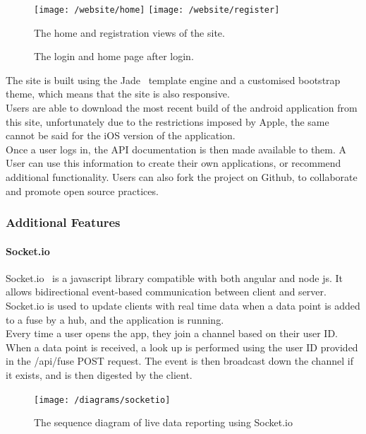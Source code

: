 \documentclass[draft,preprint,12pt,3p]{elsarticle}
\begin{document}
\begin{figure}[H]
    \centering
    \texttt{[image: /website/home]}
    \texttt{[image: /website/register]}
    \caption {The home and registration views of the site.}
\end{figure}
\begin{figure}[H]
    \centering

    \caption {The login and home page after login.}
\end{figure}

The site is built using the Jade~\cite{jade} template engine and a customised bootstrap~\cite{bootstrap} theme, which means that the site is also responsive.\\
Users are able to download the most recent build of the android application from this site, unfortunately due to the restrictions imposed by Apple, the same cannot be said for the iOS version of the application.\\
Once a user logs in, the API documentation is then made available to them. A User can use this information to create their own applications, or recommend additional functionality. Users can also fork the project on Github, to collaborate and promote open source practices.

\subsubsection{Additional Features}

\paragraph{Socket.io}
Socket.io~\cite{socketio} is a javascript library compatible with both angular and node js. It allows bidirectional event-based communication between client and server.\\
Socket.io is used to update clients with real time data when a data point is added to a fuse by a hub, and the application is running.\\
Every time a user opens the app, they join a channel based on their user ID. When a data point is received, a look up is performed using the user ID provided in the /api/fuse POST request. The event is then broadcast down the channel if it exists, and is then digested by the client.

\begin{figure}[H]
    \centering
    \texttt{[image: /diagrams/socketio]}

    \caption {The sequence diagram of live data reporting using Socket.io}
\end{figure}
\end{document}
